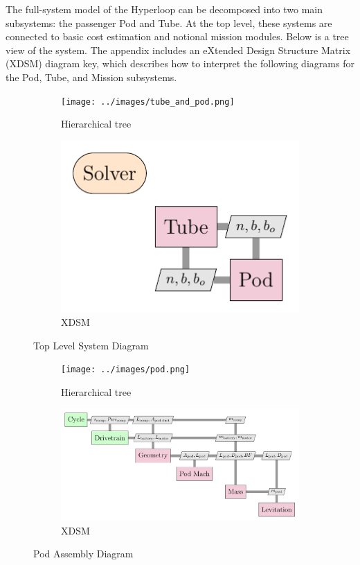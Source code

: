 The full-system model of the Hyperloop can be decomposed into two main
subsystems: the passenger Pod and Tube. At the top level, these systems are
connected to basic cost estimation and notional
mission modules. Below is a tree view of the system.
The appendix includes an eXtended Design Structure Matrix (XDSM) diagram key,
which describes how to interpret the following diagrams for the Pod, Tube, and Mission subsystems.

\begin{figure}
\centering
\begin{subfigure}[t]{.4\textwidth}
  \centering
  \texttt{[image: ../images/tube\_and\_pod.png]}
  \caption{Hierarchical tree}
  \label{fig:tree:tube_and_pod}
\end{subfigure}%
\begin{subfigure}[t]{.6\textwidth}
  \centering
  \includegraphics[width=1.0\textwidth]{../images/xdsm/tube_and_pod.pdf}
  \caption{XDSM}
  \label{fig:xdsm:toplevel}
\end{subfigure}
\caption{Top Level System Diagram}
\label{fig:top}
\end{figure}

\begin{figure}
\centering
\begin{subfigure}[t]{.5\textwidth}
  \centering
  \texttt{[image: ../images/pod.png]}
  \caption{Hierarchical tree}
  \label{fig:tree:pod}
\end{subfigure}%
\begin{subfigure}[t]{.5\textwidth}
  \centering
  \includegraphics{../images/xdsm/pod.pdf}
  \caption{XDSM}
  \label{fig:xdsm:pod}
\end{subfigure}
\caption{Pod Assembly Diagram}
\label{fig:pod}
\end{figure}

